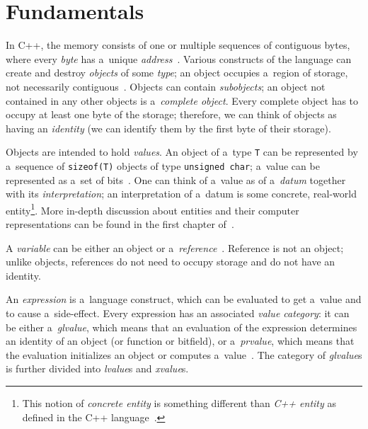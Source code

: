 \documentclass[nolot,nolof,nocover,printed]{fithesis3}
\newcommand{\stdN}[2]{\cite[#2]{#1}\xspace}
\begin{document}

\section{Fundamentals}


In C++, the memory consists of one or multiple sequences of contiguous bytes, where every \textit{byte} has a~unique \textit{address}~\stdN{n4700}{\S 4.4/1}. Various constructs of the language can create and destroy \textit{objects} of some \textit{type}; an object occupies a~region of storage, not necessarily contiguous~\stdN{n4700}{\S 4.5/1}. Objects can contain \textit{subobjects}; an object not contained in any other objects is a~\textit{complete object}. Every complete object has to occupy at least one byte of the storage; therefore, we can think of objects as having an \textit{identity} (we can identify them by the first byte of their storage).

Objects are intended to hold \textit{values}. An object of a~type \lstinline|T| can be represented by a~sequence of \lstinline|sizeof(T)| objects of type \lstinline|unsigned char|; a~value can be represented as a~set of bits~\stdN{n4296}{\S 3.9/4}.
One can think of a~value as of a~\textit{datum} together with its \textit{interpretation}; an interpretation of a~datum is some concrete, real-world entity\footnote{This notion of \textit{concrete entity} is something different than \textit{C++ entity} as defined in the C++ language~\stdN{n4296}{\S 3/3}. }. 
More in-depth discussion about entities and their computer representations can be found in the first chapter of~\cite{progelements}.

A \textit{variable} can be either an object or a~\textit{reference}~\stdN{n4700}{\S 6/6}. Reference is not an object; unlike objects, references do not need to occupy storage and do not have an identity.

An \textit{expression} is a~language construct, which can be evaluated to get a~value and to cause a~side-effect. Every expression has an associated \textit{value category}: it can be either a~\textit{glvalue}, which means that an evaluation of the expression determines an identity of an object (or function or bitfield), or a~\textit{prvalue}, which means that the evaluation initializes an object or computes a~value~\stdN{n4700}{6.10/1}. The category of \textit{glvalue}s is further divided into \textit{lvalue}s and \textit{xvalue}s. 
\end{document}
